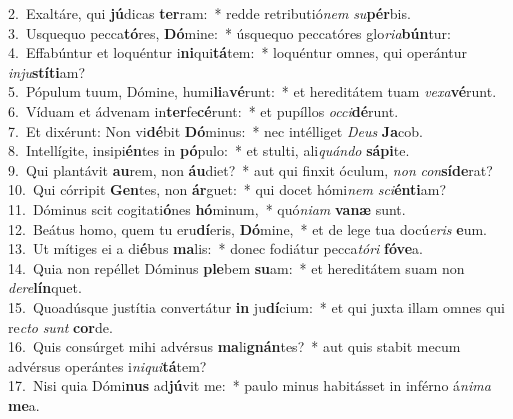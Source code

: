 {2.~}Exaltáre, qui \textbf{jú}dicas \textbf{ter}ram:~* redde retributió\textit{nem} \textit{su}\textbf{pér}bis.\\
{3.~}Usquequo pecca\textbf{tó}res, \textbf{Dó}mine:~* úsquequo peccatóres glo\textit{ri}\textit{a}\textbf{bún}tur:\\
{4.~}Effabúntur et loquéntur i\textbf{ni}qui\textbf{tá}tem:~* loquéntur omnes, qui operántur \textit{in}\textit{ju}\textbf{stí}\textbf{ti}am?\\
{5.~}Pópulum tuum, Dómine, humi\textbf{li}a\textbf{vé}runt:~* et hereditátem tuam \textit{ve}\textit{xa}\textbf{vé}runt.\\
{6.~}Víduam et ádvenam in\textbf{ter}fe\textbf{cé}runt:~* et pupíllos \textit{oc}\textit{ci}\textbf{dé}runt.\\
{7.~}Et dixérunt: Non vi\textbf{dé}bit \textbf{Dó}minus:~* nec intélliget \textit{De}\textit{us} \textbf{Ja}cob.\\
{8.~}Intellígite, insipi\textbf{én}tes in \textbf{pó}pulo:~* et stulti, ali\textit{quán}\textit{do} \textbf{sá}\textbf{pi}te.\\
{9.~}Qui plantávit \textbf{au}rem, non \textbf{áu}diet?~* aut qui finxit óculum, \textit{non} \textit{con}\textbf{sí}\textbf{de}rat?\\
{10.~}Qui córripit \textbf{Gen}tes, non \textbf{ár}guet:~* qui docet hómi\textit{nem} \textit{sci}\textbf{én}\textbf{ti}am?\\
{11.~}Dóminus scit cogitati\textbf{ó}nes \textbf{hó}minum,~* quó\textit{ni}\textit{am} \textbf{va}\textbf{næ} sunt.\\
{12.~}Beátus homo, quem tu eru\textbf{dí}eris, \textbf{Dó}mine,~* et de lege tua docú\textit{e}\textit{ris} \textbf{e}um.\\
{13.~}Ut mítiges ei a di\textbf{é}bus \textbf{ma}lis:~* donec fodiátur pecca\textit{tó}\textit{ri} \textbf{fó}\textbf{ve}a.\\
{14.~}Quia non repéllet Dóminus \textbf{ple}bem \textbf{su}am:~* et hereditátem suam non \textit{de}\textit{re}\textbf{lín}quet.\\
{15.~}Quoadúsque justítia convertátur \textbf{in} ju\textbf{dí}cium:~* et qui juxta illam omnes qui re\textit{cto} \textit{sunt} \textbf{cor}de.\\
{16.~}Quis consúrget mihi advérsus \textbf{ma}li\textbf{gnán}tes?~* aut quis stabit mecum advérsus operántes i\textit{ni}\textit{qui}\textbf{tá}tem?\\
{17.~}Nisi quia Dómi\textbf{nus} ad\textbf{jú}vit me:~* paulo minus habitásset in inférno á\textit{ni}\textit{ma} \textbf{me}a.\\
